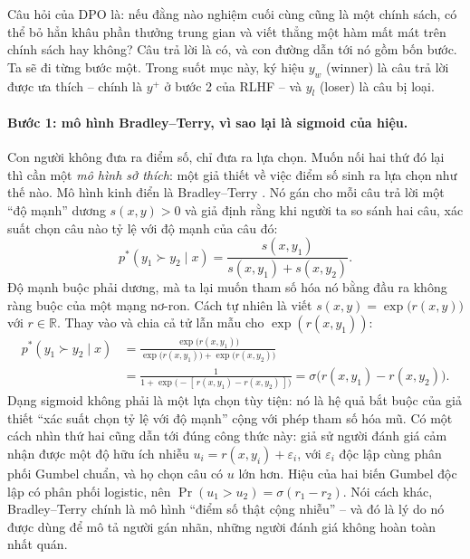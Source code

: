 Câu hỏi của DPO \cite{rafailov2023direct} là: nếu đằng nào nghiệm cuối cùng cũng là một chính sách, có thể bỏ hẳn khâu phần thưởng trung gian và viết thẳng một hàm mất mát trên chính sách hay không? Câu trả lời là có, và con đường dẫn tới nó gồm bốn bước. Ta sẽ đi từng bước một. Trong suốt mục này, ký hiệu \( y_w \) (winner) là câu trả lời được ưa thích -- chính là \( y^+ \) ở bước 2 của RLHF -- và \( y_l \) (loser) là câu bị loại.

\paragraph{Bước 1: mô hình Bradley--Terry, vì sao lại là sigmoid của hiệu.}
Con người không đưa ra điểm số, chỉ đưa ra lựa chọn. Muốn nối hai thứ đó lại thì cần một \emph{mô hình sở thích}: một giả thiết về việc điểm số sinh ra lựa chọn như thế nào. Mô hình kinh điển là Bradley--Terry \cite{bradley1952rank}. Nó gán cho mỗi câu trả lời một ``độ mạnh'' dương \( s(x,y) > 0 \) và giả định rằng khi người ta so sánh hai câu, xác suất chọn câu nào tỷ lệ với độ mạnh của câu đó:
\[
    p^{*}(y_1 \succ y_2 \mid x) = \frac{s(x,y_1)}{s(x,y_1) + s(x,y_2)} .
\]
Độ mạnh buộc phải dương, mà ta lại muốn tham số hóa nó bằng đầu ra không ràng buộc của một mạng nơ-ron. Cách tự nhiên là viết \( s(x,y) = \exp\big(r(x,y)\big) \) với \( r \in \mathbb{R} \). Thay vào và chia cả tử lẫn mẫu cho \( \exp(r(x,y_1)) \):
\[
\begin{aligned}
    p^{*}(y_1 \succ y_2 \mid x)
    &= \frac{\exp\big(r(x,y_1)\big)}{\exp\big(r(x,y_1)\big) + \exp\big(r(x,y_2)\big)} \\[4pt]
    &= \frac{1}{1 + \exp\big(-[\,r(x,y_1) - r(x,y_2)\,]\big)}
    = \sigma\big(r(x,y_1) - r(x,y_2)\big).
\end{aligned}
\]
Dạng sigmoid không phải là một lựa chọn tùy tiện: nó là hệ quả bắt buộc của giả thiết ``xác suất chọn tỷ lệ với độ mạnh'' cộng với phép tham số hóa mũ. Có một cách nhìn thứ hai cũng dẫn tới đúng công thức này: giả sử người đánh giá cảm nhận được một độ hữu ích nhiễu \( u_i = r(x,y_i) + \varepsilon_i \), với \( \varepsilon_i \) độc lập cùng phân phối Gumbel chuẩn, và họ chọn câu có \( u \) lớn hơn. Hiệu của hai biến Gumbel độc lập có phân phối logistic, nên \( \Pr(u_1 > u_2) = \sigma(r_1 - r_2) \). Nói cách khác, Bradley--Terry chính là mô hình ``điểm số thật cộng nhiễu'' -- và đó là lý do nó được dùng để mô tả người gán nhãn, những người đánh giá không hoàn toàn nhất quán.

